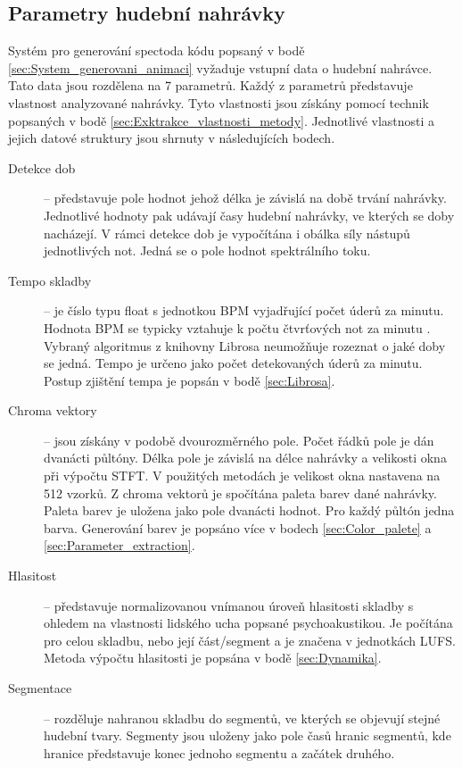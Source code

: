 \subsection{Parametry hudební nahrávky} \label{sec:Parametry_nahravky}
Systém pro generování spectoda kódu popsaný v bodě \ref{sec:System_generovani_animaci} vyžaduje vstupní data o hudební nahrávce. Tato data jsou rozdělena na 7 parametrů. Každý z parametrů představuje vlastnost analyzované nahrávky. Tyto vlastnosti jsou získány pomocí technik popsaných v bodě \ref{sec:Exktrakce_vlastnosti_metody}. Jednotlivé vlastnosti a jejich datové struktury jsou shrnuty v následujících bodech.

\begin{description}
    \item[Detekce dob] -- představuje pole hodnot jehož délka je závislá na době trvání nahrávky. Jednotlivé hodnoty pak udávají časy hudební nahrávky, ve kterých se doby nacházejí. V rámci detekce dob je vypočítána i obálka síly nástupů jednotlivých not. Jedná se o pole hodnot spektrálního toku. 
    
    \item[Tempo skladby] -- je číslo typu float s jednotkou \acs{BPM} vyjadřující počet úderů za minutu. Hodnota BPM se typicky vztahuje k počtu čtvrťových not za minutu \cite{Harvard_dictionary_of_music}. Vybraný algoritmus z knihovny Librosa neumožňuje rozeznat o jaké doby se jedná. Tempo je určeno jako počet detekovaných úderů za minutu. Postup zjištění tempa je popsán v bodě \ref{sec:Librosa}.

    \item[Chroma vektory] -- jsou získány v podobě dvourozměrného pole. Počet řádků pole je dán dvanácti půltóny. Délka pole je závislá na délce nahrávky a velikosti okna při výpočtu \acs{STFT}. V použitých metodách je velikost okna nastavena na 512 vzorků. Z chroma vektorů je spočítána paleta barev dané nahrávky. Paleta barev je uložena jako pole dvanácti hodnot. Pro každý půltón jedna barva. Generování barev je popsáno více v bodech \ref{sec:Color_palete} a \ref{sec:Parameter_extraction}.

    \item[Hlasitost] -- představuje normalizovanou vnímanou úroveň hlasitosti skladby s ohledem na vlastnosti lidského ucha popsané psychoakustikou. Je počítána pro celou skladbu, nebo její část/segment a je značena v jednotkách \acs{LUFS}. Metoda výpočtu hlasitosti je popsána v bodě \ref{sec:Dynamika}.

    \item[Segmentace] -- rozděluje nahranou skladbu do segmentů, ve kterých se objevují stejné hudební tvary. Segmenty jsou uloženy jako pole časů hranic segmentů, kde hranice představuje konec jednoho segmentu a začátek druhého. 


\end{description}
